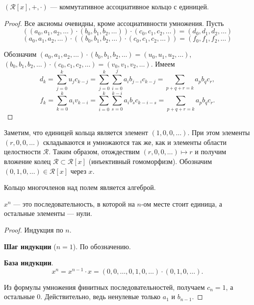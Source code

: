 \begin{lemma}
    $(\mathcal{R}[x], +, \boldsymbol{\cdot})$ --- коммутативное ассоциативное кольцо с единицей.
\end{lemma}

\begin{proof}
    Все аксиомы очевидны, кроме ассоциативности умножения. Пусть
    $$
    ((a_0, a_1, a_2, \ldots) \cdot (b_0, b_1, b_2, \ldots)) \cdot (c_0, c_1, c_2, \ldots) = (d_0, d_1, d_2, \ldots)
    $$
    $$
    (a_0, a_1, a_2, \ldots) \cdot ((b_0, b_1, b_2, \ldots) \cdot (c_0, c_1, c_2, \ldots)) = (f_0, f_1, f_2, \ldots)
    $$

    Обозначим $(a_0, a_1, a_2, \ldots) \cdot (b_0, b_1, b_2, \ldots) = (u_0, u_1, u_2, \ldots)$, $(b_0, b_1, b_2, \ldots) \cdot (c_0, c_1, c_2, \ldots) = (v_0, v_1, v_2, \ldots)$.
    Имеем
    $$
    d_k = \sum_{j = 0}^ku_jc_{k - j} = \sum_{j = 0}^k\sum_{i = 0}^ja_ib_{j - i}c_{k - j} = \sum_{p + q + r = k}a_pb_qc_r,
    $$
    $$
    f_k = \sum_{k = 0}^ka_iv_{k - i} = \sum_{i = 0}^k\sum_{s = 0}^{k - i}a_ib_sc_{k - i - s} = \sum_{p + q + r = k}a_pb_qc_r.
    $$
\end{proof}

Заметим, что единицей кольца является элемент $(1, 0, 0, \ldots)$. При этом элементы $(r, 0, 0, \ldots)$ складываются и умножаются так же, как и элементы области целостности $\mathcal{R}$. Таким образом, отождествим $(r, 0, 0, \ldots) \mapsto r$ и получим вложение колец $\mathcal{R} \subset \mathcal{R}[x]$ (инъективный гомоморфизм). Обозначим $(0, 1, 0, \ldots) \in \mathcal{R}[x]$ через $x$.

\begin{remark}
    Кольцо многочленов над полем является алгеброй.
\end{remark}

\begin{lemma}
    $x^n$ --- это последовательность, в которой на $n$-ом месте стоит единица, а остальные элементы --- нули.
\end{lemma}

\begin{proof}
    Индукция по $n$.

    \textbf{Шаг индукции} ($n = 1$). По обозначению.

    \textbf{База индукции}.
    $$
    x^n = x^{n - 1} \cdot x = (0, 0, \ldots, 0, 1, 0, \ldots) \cdot (0, 1, 0, \ldots).
    $$

    Из формулы умножения финитных последовательностей, получаем $c_n = 1$, а остальные $0$. Действительно, ведь ненулевые только $a_1$ и $b_{n - 1}$.
\end{proof}

